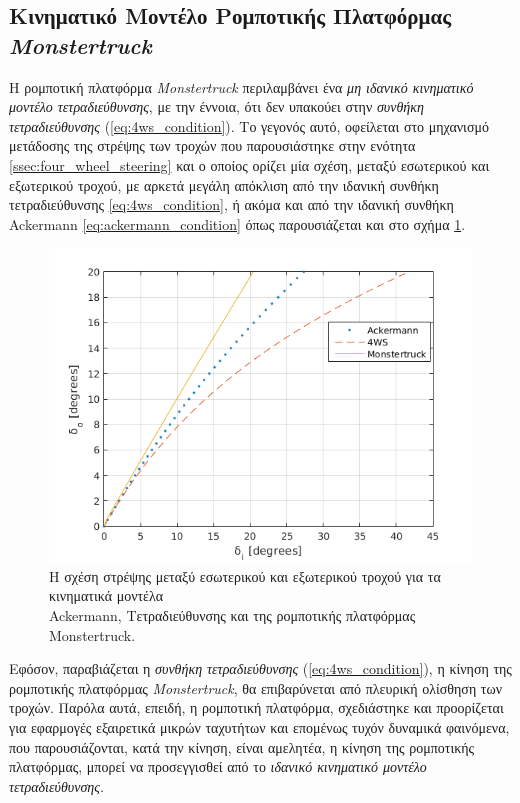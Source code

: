 \newpage
\bigskip
\subsection{Κινηματικό Μοντέλο Ρομποτικής Πλατφόρμας \textit{Monstertruck}} \label{ssec:monstertruck_kinematics}
Η ρομποτική πλατφόρμα \textit{Monstertruck} περιλαμβάνει ένα \textit{μη ιδανικό κινηματικό μοντέλο τετραδιεύθυνσης}, με την έννοια, ότι δεν υπακούει στην \textit{συνθήκη τετραδιεύθυνσης} (\ref{eq:4ws_condition}). Το γεγονός αυτό, οφείλεται στο μηχανισμό μετάδοσης της στρέψης των τροχών που παρουσιάστηκε στην ενότητα \ref{ssec:four_wheel_steering} και ο οποίος ορίζει μία σχέση, μεταξύ εσωτερικού και εξωτερικού τροχού, με αρκετά μεγάλη απόκλιση από την ιδανική συνθήκη τετραδιεύθυνσης \ref{eq:4ws_condition}, ή ακόμα και από την ιδανική συνθήκη Ackermann \ref{eq:ackermann_condition} όπως παρουσιάζεται και στο σχήμα \ref{fig:steer_angles_comparison}.

\begin{figure}[!ht]
	\centering
	\includegraphics[width=0.6\linewidth]{Chapters/Chapter2/Figures/steer_angles_comparison.png}
	\caption{Η σχέση στρέψης μεταξύ εσωτερικού και εξωτερικού τροχού για τα κινηματικά μοντέλα \\Ackermann, Τετραδιεύθυνσης και της ρομποτικής πλατφόρμας Monstertruck.}
	\label{fig:steer_angles_comparison}
\end{figure}

Εφόσον, παραβιάζεται η \textit{συνθήκη τετραδιεύθυνσης} (\ref{eq:4ws_condition}), η κίνηση της ρομποτικής πλατφόρμας \textit{Monstertruck}, θα επιβαρύνεται από πλευρική ολίσθηση των τροχών. Παρόλα αυτά, επειδή, η ρομποτική πλατφόρμα, σχεδιάστηκε και προορίζεται για εφαρμογές εξαιρετικά μικρών ταχυτήτων και επομένως τυχόν δυναμικά φαινόμενα, που παρουσιάζονται, κατά την κίνηση, είναι αμελητέα, η κίνηση της ρομποτικής πλατφόρμας, μπορεί να προσεγγισθεί από το \textit{ιδανικό κινηματικό μοντέλο τετραδιεύθυνσης}. 

